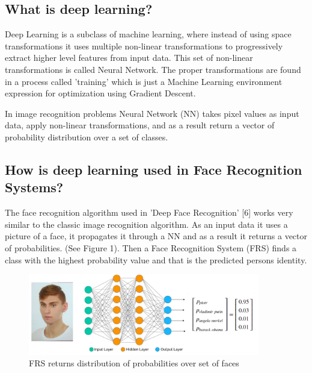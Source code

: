 \subsection{What is deep learning?}
Deep Learning is a subclass of machine learning, where instead of using space transformations it uses multiple non-linear transformations to progressively extract higher level features from input data. This set of non-linear transformations is called Neural Network. The proper transformations are found in a process called 'training' which is just a Machine Learning environment expression for optimization using Gradient Descent.  

In image recognition problems Neural Network (NN) takes pixel values as input data, apply non-linear transformations, and as a result return a vector of probability distribution over a set of classes.


\subsection{How is deep learning used in Face Recognition Systems?}


The face recognition algorithm used in 'Deep Face Recognition' [6] works very similar to the classic image recognition algorithm. As an input data it uses a picture of a face, it propagates it through a NN and as a result it returns a vector of probabilities. (See Figure 1). Then a Face Recognition System (FRS) finds a class with the highest probability value and that is the predicted persons identity. 

\begin{figure}[!ht]
\centering
\includegraphics[width=0.9\textwidth]{Images/face-recognition.png}
\caption[]{FRS returns distribution of probabilities over set of faces}
\end{figure}